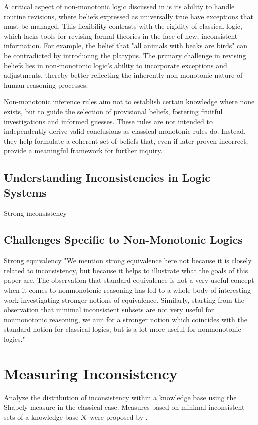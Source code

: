 A critical aspect of non-monotonic logic discussed in \cite{mcdermott_non-monotonic_1980} is its ability to handle routine revisions, where beliefs expressed as universally true have exceptions that must be managed.
This flexibility contrasts with the rigidity of classical logic, which lacks tools for revising formal theories in the face of new, inconsistent information.
For example, the belief that "all animals with beaks are birds" can be contradicted by introducing the platypus.
The primary challenge in revising beliefs lies in non-monotonic logic's ability to incorporate exceptions and adjustments, thereby better reflecting the inherently non-monotonic nature of human reasoning processes.

Non-monotonic inference rules aim not to establish certain knowledge where none exists, but to guide the selection of provisional beliefs, fostering fruitful investigations and informed guesses.
These rules are not intended to independently derive valid conclusions as classical monotonic rules do.
Instead, they help formulate a coherent set of beliefs that, even if later proven incorrect, provide a meaningful framework for further inquiry.

\subsection{Understanding Inconsistencies in Logic Systems}
Strong inconsistency \cite{brewka_strong_2019}

\subsection{Challenges Specific to Non-Monotonic Logics}
Strong equivalency \cite{lifschitz_strongly_2001}
"We mention strong equivalence here not because it is closely related to inconsistency, but because it helps to illustrate what the goals of this paper are. The observation that standard equivalence is not a very useful concept when it comes to nonmonotonic reasoning has led to a whole body of interesting work investigating stronger notions of equivalence. Similarly, starting from the observation that minimal inconsistent subsets are not very useful for nonmonotonic reasoning, we aim for a stronger notion which coincides with the standard notion for classical logics, but is a lot more useful for nonmonotonic logics." \cite{brewka_strong_2019}

\section{Measuring Inconsistency}
Analyze the distribution of inconsistency within a knowledge base using the Shapely measure \cite{hunter_measure_2010} in the classical case.
Measures based on minimal inconsistent sets of a knowledge base \(\mathcal{K}\) \cite{jabbour_mis_2016} were proposed by \cite{ulbricht_measuring_2018}.

